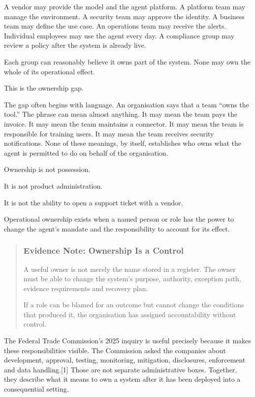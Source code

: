 A vendor may provide the model and the agent platform. A platform team
may manage the environment. A security team may approve the identity. A
business team may define the use case. An operations team may receive
the alerts. Individual employees may use the agent every day. A
compliance group may review a policy after the system is already live.

Each group can reasonably believe it owns part of the system. None may
own the whole of its operational effect.

This is the ownership gap.

The gap often begins with language. An organisation says that a team
``owns the tool.'' The phrase can mean almost anything. It may mean the
team pays the invoice. It may mean the team maintains a connector. It
may mean the team is responsible for training users. It may mean the
team receives security notifications. None of these meanings, by itself,
establishes who owns what the agent is permitted to do on behalf of the
organisation.

Ownership is not possession.

It is not product administration.

It is not the ability to open a support ticket with a vendor.

Operational ownership exists when a named person or role has the power
to change the agent's mandate and the responsibility to account for its
effect.

\begin{quote}
\subsubsection{Evidence Note: Ownership Is a
Control}\label{evidence-note-ownership-is-a-control}

A useful owner is not merely the name stored in a register. The owner
must be able to change the system's purpose, authority, exception path,
evidence requirements and recovery plan.

If a role can be blamed for an outcome but cannot change the conditions
that produced it, the organisation has assigned accountability without
control.
\end{quote}

The Federal Trade Commission's 2025 inquiry is useful precisely because
it makes these responsibilities visible. The Commission asked the
companies about development, approval, testing, monitoring, mitigation,
disclosures, enforcement and data handling.{[}1{]} Those are not
separate administrative boxes. Together, they describe what it means to
own a system after it has been deployed into a consequential setting.

